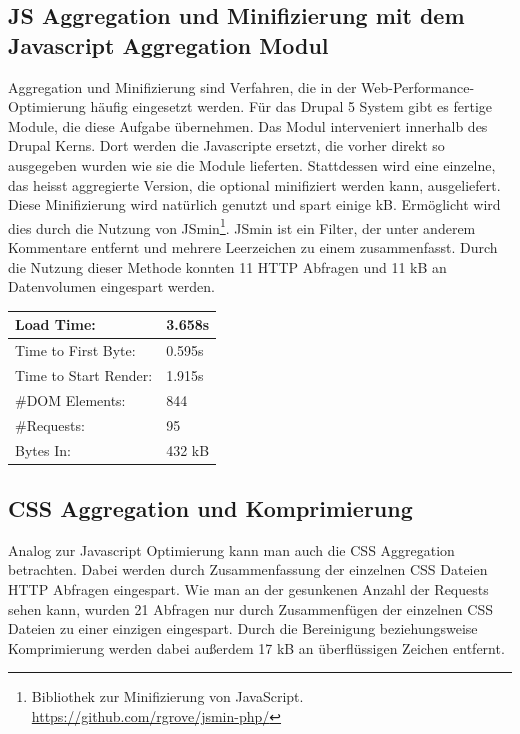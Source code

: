 \subsection{JS Aggregation und Minifizierung mit dem Javascript Aggregation Modul}
Aggregation und Minifizierung sind Verfahren, die in der Web-Performance-Optimierung häufig eingesetzt werden. Für das Drupal 5 System gibt es fertige Module, die diese Aufgabe übernehmen. Das Modul interveniert innerhalb des Drupal Kerns. Dort werden die Javascripte ersetzt, die vorher direkt so ausgegeben wurden wie sie die Module lieferten. Stattdessen wird eine einzelne, das heisst aggregierte Version, die optional minifiziert werden kann, ausgeliefert. Diese Minifizierung wird natürlich genutzt und spart einige kB. Ermöglicht wird dies durch die Nutzung von JSmin\footnote{Bibliothek zur Minifizierung von JavaScript. \url{https://github.com/rgrove/jsmin-php/}}. JSmin ist ein Filter, der unter anderem Kommentare entfernt und mehrere Leerzeichen zu einem zusammenfasst. Durch die Nutzung dieser Methode konnten 11 HTTP Abfragen und 11 kB an Datenvolumen eingespart werden.

\begin{table}[h]
\caption{Ergebnis der JS Aggregation und Komprimierung}
    \begin{longtable}{ | p{3cm} | p{1.5cm} | }
    \hline
    Load Time: 			& 3.658s 	\\ \hline
    Time to First Byte:		& 0.595s  	\\ \hline
    Time to Start Render:	& 1.915s	\\ \hline
    \#DOM Elements:		& 844 		\\ \hline
    \#Requests:			& 95 		\\ \hline
    Bytes In:			& 432 kB 	\\ \hline
    \hline
    \end{longtable}
\end{table}

\subsection{CSS Aggregation und Komprimierung}
Analog zur Javascript Optimierung kann man auch die CSS Aggregation betrachten. Dabei werden durch Zusammenfassung der einzelnen CSS Dateien HTTP Abfragen eingespart. Wie man an der gesunkenen Anzahl der Requests sehen kann, wurden 21 Abfragen nur durch Zusammenfügen der einzelnen CSS Dateien zu einer einzigen eingespart. Durch die Bereinigung beziehungsweise Komprimierung werden dabei außerdem 17 kB an überflüssigen Zeichen entfernt. 

